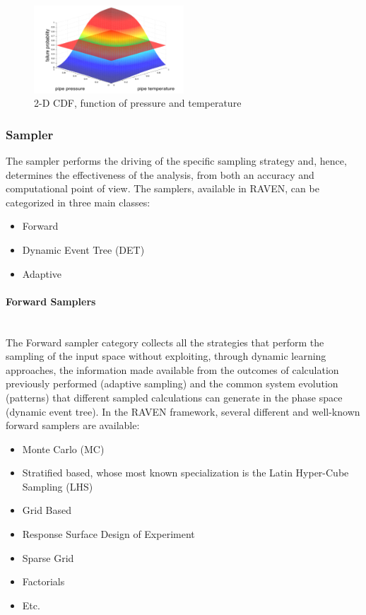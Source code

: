 \begin{figure}
  \centering
  \includegraphics[width=0.5\textwidth]  {pics/NDimensionalDistributionExample.png}
  \caption{2-D CDF, function of pressure and temperature}
  \label{fig:NDDistributionExample}
\end{figure}

\subsubsection{Sampler}
The sampler performs the driving of the specific sampling strategy and, hence, determines the effectiveness of the 
analysis, from both an accuracy and computational point of view.  The samplers, available in RAVEN, can be 
categorized in three main classes:
\begin{itemize}
 \item Forward
 \item Dynamic Event Tree (DET)
 \item Adaptive
\end{itemize}
\paragraph{Forward Samplers} ~\\
The Forward sampler category collects all the strategies that perform the sampling of the input space without exploiting, 
through dynamic learning approaches, the information made available from the outcomes of calculation previously 
performed (adaptive sampling) and the common system evolution (patterns) that different sampled calculations can 
generate in the phase space (dynamic event tree).
In the RAVEN framework, several different and well-known forward samplers are available:
\begin{itemize}
\item Monte Carlo (MC)
\item Stratified based, whose most known specialization is the Latin Hyper-Cube Sampling (LHS)
\item Grid Based
\item Response Surface Design of Experiment
\item Sparse Grid
\item Factorials
\item Etc.
\end{itemize}
